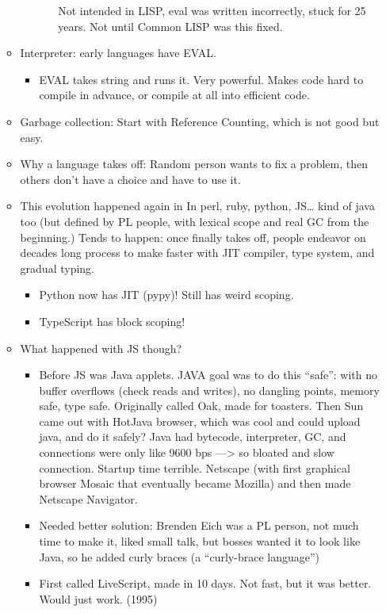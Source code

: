 \documentclass[twoside]{article}
\begin{document}
\begin{itemize}
\begin{itemize}
\begin{itemize}
\begin{itemize}
Not intended in LISP, eval was written incorrectly, stuck for 25 years. Not until Common LISP was this fixed. 
\end{itemize}
\end{itemize}
\item Interpreter: early languages have EVAL.
\begin{itemize}
\item EVAL takes string and runs it. Very powerful. Makes code hard to compile in advance, or compile at all into efficient code.
\end{itemize}
\item Garbage collection:
Start with Reference Counting, which is not good but easy.
\item Why a language takes off:
Random person wants to fix a problem, then others don't have a choice and have to use it.
\item This evolution happened again in In perl, ruby, python, JS… kind of java too (but defined by PL people, with lexical scope and real GC from the beginning.) Tends to happen: once finally takes off, people endeavor on decades long process to make faster with JIT compiler, type system, and gradual typing.
\begin{itemize}
\item Python now has JIT (pypy)! Still has weird scoping. 
\item TypeScript has block scoping!
\end{itemize}
\item What happened with JS though?
\begin{itemize}
\item Before JS was Java applets. JAVA goal was to do this “safe”: with no buffer overflows (check reads and writes), no dangling points, memory safe, type safe. Originally called Oak, made for toasters. Then Sun came out with HotJava browser, which was cool and could upload java, and do it safely? Java had bytecode, interpreter, GC, and connections were only like 9600 bps —> so bloated and slow connection. Startup time terrible. Netscape (with first graphical browser Mosaic that eventually became Mozilla) and then made Netscape Navigator. 
\item Needed better solution: Brenden Eich was a PL person, not much time to make it, liked small talk, but bosses wanted it to look like Java, so he added curly braces (a “curly-brace language”) 
\item First called LiveScript, made in 10 days. Not fast, but it was better. Would just work. (1995)

\end{itemize}
\end{itemize}
\end{itemize}
\end{document}
